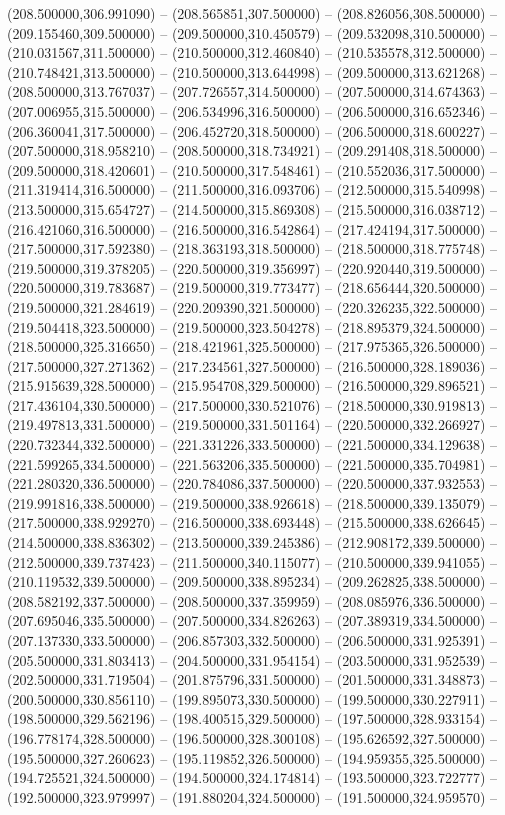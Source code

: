 (208.500000,306.991090) -- (208.565851,307.500000) -- (208.826056,308.500000) -- (209.155460,309.500000) -- (209.500000,310.450579) -- (209.532098,310.500000) -- (210.031567,311.500000) -- (210.500000,312.460840) -- (210.535578,312.500000) -- (210.748421,313.500000) -- (210.500000,313.644998) -- (209.500000,313.621268) -- (208.500000,313.767037) -- (207.726557,314.500000) -- (207.500000,314.674363) -- (207.006955,315.500000) -- (206.534996,316.500000) -- (206.500000,316.652346) -- (206.360041,317.500000) -- (206.452720,318.500000) -- (206.500000,318.600227) -- (207.500000,318.958210) -- (208.500000,318.734921) -- (209.291408,318.500000) -- (209.500000,318.420601) -- (210.500000,317.548461) -- (210.552036,317.500000) -- (211.319414,316.500000) -- (211.500000,316.093706) -- (212.500000,315.540998) -- (213.500000,315.654727) -- (214.500000,315.869308) -- (215.500000,316.038712) -- (216.421060,316.500000) -- (216.500000,316.542864) -- (217.424194,317.500000) -- (217.500000,317.592380) -- (218.363193,318.500000) -- (218.500000,318.775748) -- (219.500000,319.378205) -- (220.500000,319.356997) -- (220.920440,319.500000) -- (220.500000,319.783687) -- (219.500000,319.773477) -- (218.656444,320.500000) -- (219.500000,321.284619) -- (220.209390,321.500000) -- (220.326235,322.500000) -- (219.504418,323.500000) -- (219.500000,323.504278) -- (218.895379,324.500000) -- (218.500000,325.316650) -- (218.421961,325.500000) -- (217.975365,326.500000) -- (217.500000,327.271362) -- (217.234561,327.500000) -- (216.500000,328.189036) -- (215.915639,328.500000) -- (215.954708,329.500000) -- (216.500000,329.896521) -- (217.436104,330.500000) -- (217.500000,330.521076) -- (218.500000,330.919813) -- (219.497813,331.500000) -- (219.500000,331.501164) -- (220.500000,332.266927) -- (220.732344,332.500000) -- (221.331226,333.500000) -- (221.500000,334.129638) -- (221.599265,334.500000) -- (221.563206,335.500000) -- (221.500000,335.704981) -- (221.280320,336.500000) -- (220.784086,337.500000) -- (220.500000,337.932553) -- (219.991816,338.500000) -- (219.500000,338.926618) -- (218.500000,339.135079) -- (217.500000,338.929270) -- (216.500000,338.693448) -- (215.500000,338.626645) -- (214.500000,338.836302) -- (213.500000,339.245386) -- (212.908172,339.500000) -- (212.500000,339.737423) -- (211.500000,340.115077) -- (210.500000,339.941055) -- (210.119532,339.500000) -- (209.500000,338.895234) -- (209.262825,338.500000) -- (208.582192,337.500000) -- (208.500000,337.359959) -- (208.085976,336.500000) -- (207.695046,335.500000) -- (207.500000,334.826263) -- (207.389319,334.500000) -- (207.137330,333.500000) -- (206.857303,332.500000) -- (206.500000,331.925391) -- (205.500000,331.803413) -- (204.500000,331.954154) -- (203.500000,331.952539) -- (202.500000,331.719504) -- (201.875796,331.500000) -- (201.500000,331.348873) -- (200.500000,330.856110) -- (199.895073,330.500000) -- (199.500000,330.227911) -- (198.500000,329.562196) -- (198.400515,329.500000) -- (197.500000,328.933154) -- (196.778174,328.500000) -- (196.500000,328.300108) -- (195.626592,327.500000) -- (195.500000,327.260623) -- (195.119852,326.500000) -- (194.959355,325.500000) -- (194.725521,324.500000) -- (194.500000,324.174814) -- (193.500000,323.722777) -- (192.500000,323.979997) -- (191.880204,324.500000) -- (191.500000,324.959570) -- 